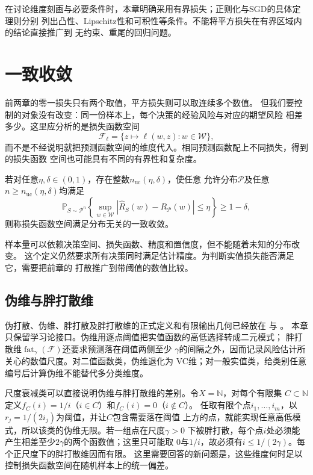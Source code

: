 在讨论维度刻画与必要条件时，本章明确采用有界损失；正则化与SGD的具体定理则分别
列出凸性、Lipschitz性和可积性等条件。不能将平方损失在有界区域内的结论直接推广到
无约束、重尾的回归问题。

\section{一致收敛}
\label{sec:real-valued-classes}

前两章的零一损失只有两个取值，平方损失则可以取连续多个数值。
但我们要控制的对象没有改变：同一份样本上，每个决策的经验风险与对应的期望风险
相差多少。这里应分析的是损失函数空间
\[
 \mathcal F_\ell=\{z\mapsto\ell(w,z):w\in\mathcal W\},
\]
而不是不经说明就把预测函数空间的维度代入。相同预测函数配上不同损失，得到的损失函数
空间也可能具有不同的有界性和复杂度。

\begin{definition}[一般学习问题的一致收敛]
\label{def:general-uniform-convergence}
若对任意$\eta,\delta\in(0,1)$，存在整数$n_{\mathrm{uc}}(\eta,\delta)$，使任意
允许分布$\mathcal P$及任意$n\geq n_{\mathrm{uc}}(\eta,\delta)$均满足
\[
 \mathbb P_{S\sim\mathcal P^n}\!\left\{
 \sup_{w\in\mathcal W}|\hat R_S(w)-R_{\mathcal P}(w)|\leq\eta
 \right\}\geq1-\delta,
\]
则称损失函数空间满足分布无关的一致收敛。
\end{definition}

样本量可以依赖决策空间、损失函数、精度和置信度，但不能随着未知的分布改变。
这个定义仍然要求所有决策同时满足估计精度。为判断实值损失能否满足它，需要把前章的
打散推广到带阈值的数值比较。

\subsection{伪维与胖打散维}

伪打散、伪维、胖打散及胖打散维的正式定义和有限输出几何已经放在
与
。
本章只保留学习论接口。伪维用逐点阈值把实值函数的高低选择转成二元模式；
胖打散维$\operatorname{fat}_\gamma(\mathcal F)$还要求预测落在阈值两侧至少
$\gamma$的间隔之外，因而记录风险估计所关心的数值尺度。对二值函数类，伪维退化为
VC维；对一般实值类，给类别任意编号后计算伪维不能替代多分类维度。

尺度衰减类可以直接说明伪维与胖打散维的差别。令$X=\mathbb N$，对每个有限集
$C\subset\mathbb N$定义$f_C(i)=1/i$（$i\in C$）和$f_C(i)=0$（$i\notin C$）。
任取有限个点$i_1,\ldots,i_m$，以$r_j=1/(2i_j)$为阈值，并让$C$包含需要落在阈值
上方的点，就能实现任意高低模式，所以该类的伪维无限。若一组点在尺度$\gamma>0$
下被胖打散，每个点$i$处必须能产生相差至少$2\gamma$的两个函数值；这里只可能取
$0$与$1/i$，故必须有$i\leq1/(2\gamma)$。每个正尺度下的胖打散维因而有限。
这里需要回答的新问题是，这些维度何时足以控制损失函数空间在随机样本上的统一偏差。

